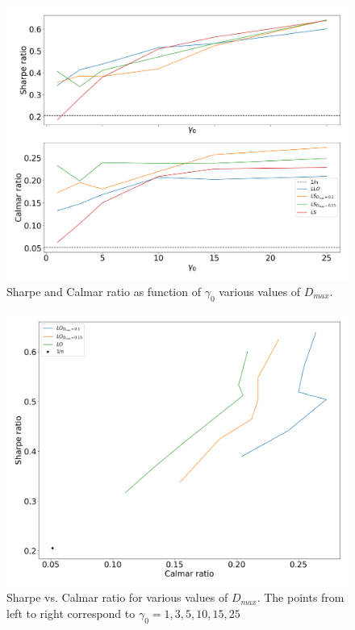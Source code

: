 \begin{figure}[H]
    \centering
    \includegraphics[width=1\textwidth]{analysis/portfolio_exercise/images/mle/sharpe_frontier_ls.png}
    \caption[Sharpe and Calmar ratio as function of $\gamma_0$ various values of $D_{max}$]{Sharpe and Calmar ratio as function of $\gamma_0$ various values of $D_{max}$.}
    \label{fig:MPC_sharpe_frontier_ls}
\end{figure}

\begin{figure}[H]
    \centering
    \includegraphics[width=1\textwidth]{analysis/portfolio_exercise/images/mle/sharpe_calmar_lo.png}
    \caption[Sharpe vs. Calmar ratio for various values of $D_{max}$]{Sharpe vs. Calmar ratio for various values of $D_{max}$. The points from left to right correspond to $\gamma_0=1,3,5,10,15,25$}
    \label{fig:MPC_sharpe_calmar_ls}
\end{figure}

